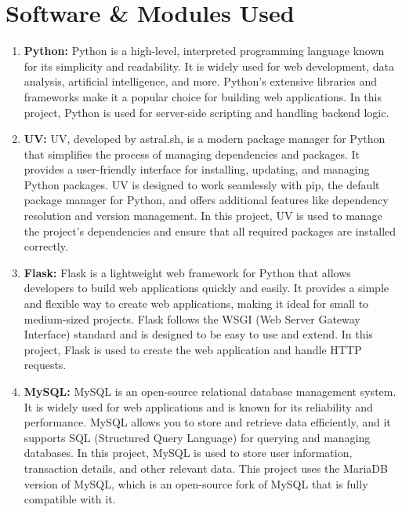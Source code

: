 \section{Software \& Modules Used}

\begin{enumerate}
    \item \textbf{Python:}
    Python is a high-level, interpreted programming language known for its
    simplicity and readability. It is widely used for web development, data
    analysis, artificial intelligence, and more. Python's extensive libraries
    and frameworks make it a popular choice for building web applications. In
    this project, Python is used for server-side scripting and handling
    backend logic.

    \item \textbf{UV:}
    UV, developed by astral.sh, is a modern package manager for Python that
    simplifies the process of managing dependencies and packages. It provides a
    user-friendly interface for installing, updating, and managing Python
    packages. UV is designed to work seamlessly with pip, the default package
    manager for Python, and offers additional features like dependency
    resolution and version management. In this project, UV is used to manage
    the project's dependencies and ensure that all required packages are
    installed correctly.

    \item \textbf{Flask:}
    Flask is a lightweight web framework for Python that allows developers to
    build web applications quickly and easily. It provides a simple and
    flexible way to create web applications, making it ideal for small to
    medium-sized projects. Flask follows the WSGI (Web Server Gateway
    Interface) standard and is designed to be easy to use and extend. In this
    project, Flask is used to create the web application and handle HTTP
    requests.

    \item \textbf{MySQL:}
    MySQL is an open-source relational database management system. It is widely
    used for web applications and is known for its reliability and performance.
    MySQL allows you to store and retrieve data efficiently, and it supports
    SQL (Structured Query Language) for querying and managing databases. In
    this project, MySQL is used to store user information, transaction details,
    and other relevant data. This project uses the MariaDB version of MySQL,
    which is an open-source fork of MySQL that is fully compatible with it.


\end{enumerate}
